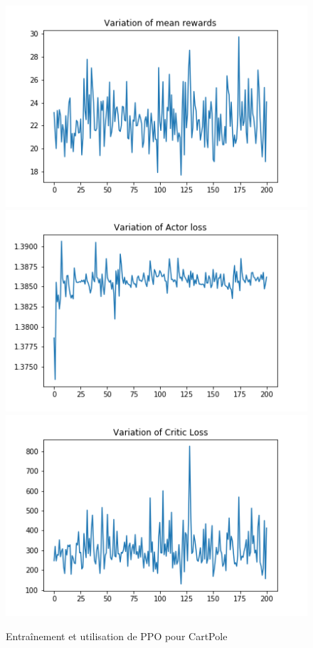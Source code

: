 \documentclass{standalone}
\begin{document}
	
	\begin{figure}[H]
		\center
		\includegraphics[scale=0.5]{img/ppo_meanrewards.png}
		\includegraphics[scale=0.5]{img/actorloss.png}
		\includegraphics[scale=0.5]{img/ppo_critloss.png}
		\caption{Entraînement et utilisation de PPO pour CartPole}
		\label{vae:samples}
	\end{figure}
	
	
\end{document}
